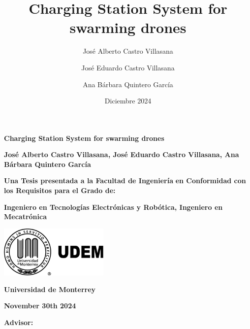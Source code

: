 \documentclass[11pt]{report} %
\title{Charging Station System for swarming drones} %
\author{José Alberto Castro Villasana \and José Eduardo Castro Villasana \and Ana Bárbara Quintero García} %
\date{Diciembre 2024} %
\begin{document}
\begin{titlepage}
    \centering
    \vspace*{1cm}
    
    {\Huge\textbf{Charging Station System for swarming drones}} %
    
    \vspace{2.5cm} %
    {\Large\textbf{José Alberto Castro Villasana, José Eduardo Castro Villasana, Ana Bárbara Quintero García}} %
    
    \vfill
    
    {\large\textbf{Una Tesis presentada a la Facultad de Ingeniería}} %
    {\large\textbf{en Conformidad con los Requisitos para el Grado de:}} %
    
    \vspace{0.2cm}
    {\large\textbf{Ingeniero en Tecnologías Electrónicas y Robótica, Ingeniero en Mecatrónica}} %
    
    \vspace{2cm}
    
    \includegraphics[width=0.4\textwidth]{pictures/logo_udem.png} %
    
    \vspace{2cm}
    
    {\large\textbf{Universidad de Monterrey}}

    \vspace{0.2cm}
    {\large{}}

    \vspace{0.2cm}
    {\large{}} %
    
    \vspace{1.5cm}
    {\large\textbf{November 30th 2024}} %
    
    \vfill
    {\large\textbf{Advisor:} } %
    
\end{titlepage}
\end{document}
